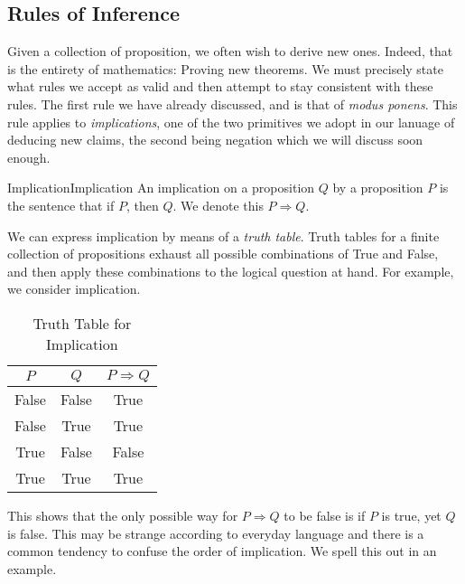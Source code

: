     \subsection{Rules of Inference}
        Given a collection of proposition, we often wish to derive new ones.
        Indeed, that is the entirety of mathematics: Proving new theorems. We
        must precisely state what rules we accept as valid and then attempt to
        stay consistent with these rules. The first rule we have already
        discussed, and is that of \textit{modus ponens}. This rule applies to
        \textit{implications}, one of the two primitives we adopt in our
        lanuage of deducing new claims, the second being negation which we will
        discuss soon enough.
        \begin{fdefinition}{Implication}{Implication}
            An implication on a proposition $Q$ by a proposition $P$ is the
            sentence that if $P$, then $Q$. We denote this $P\Rightarrow{Q}$.
        \end{fdefinition}
        We can express implication by means of a \textit{truth table}. Truth
        tables for a finite collection of propositions exhaust all possible
        combinations of True and False, and then apply these combinations to the
        logical question at hand. For example, we consider implication.
        \begin{table}[H]
            \centering
            \captionsetup{type=table}
            \begin{tabular}{c|c|c}
                $P$&$Q$&$P\Rightarrow{Q}$\\
                \hline
                False&False&True\\
                False&True&True\\
                True&False&False\\
                True&True&True
            \end{tabular}
            \caption{Truth Table for Implication}
            \label{tab:Truth_Table_Implication}
        \end{table}
        This shows that the only possible way for $P\Rightarrow{Q}$ to be false
        is if $P$ is true, yet $Q$ is false. This may be strange according to
        everyday language and there is a common tendency to confuse the order of
        implication. We spell this out in an example.
